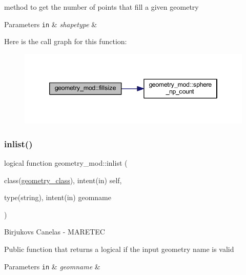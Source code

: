 method to get the number of points that fill a given geometry 
\begin{DoxyParams}[1]{Parameters}
\mbox{\tt in}  & {\em shapetype} & \\
\hline
\end{DoxyParams}
Here is the call graph for this function\+:
\nopagebreak
\begin{figure}[H]
\begin{center}
\leavevmode
\includegraphics[width=346pt]{namespacegeometry__mod_a92602e1198d3607613ea2722fb002685_cgraph}
\end{center}
\end{figure}
\mbox{\label{namespacegeometry__mod_a22dd77024fce56da299445a697256155}} 
\subsubsection{\texorpdfstring{inlist()}{inlist()}}
{\footnotesize\ttfamily logical function geometry\+\_\+mod\+::inlist (\begin{DoxyParamCaption}\item[{class(\hyperlink{structgeometry__mod_1_1geometry__class}{geometry\+\_\+class}), intent(in)}]{self,  }\item[{type(string), intent(in)}]{geomname }\end{DoxyParamCaption})\hspace{0.3cm}{\ttfamily [private]}}



Birjukovs Canelas -\/ M\+A\+R\+E\+T\+EC 

Public function that returns a logical if the input geometry name is valid 
\begin{DoxyParams}[1]{Parameters}
\mbox{\tt in}  & {\em geomname} & \\
\hline
\end{DoxyParams}
\mbox{\label{namespacegeometry__mod_abcb09c0f5274c27cb79b0dd009ed94b3}} 
